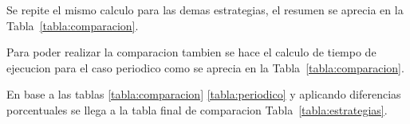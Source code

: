 \documentclass[conference]{IEEEtran}
\begin{document}
Se repite el mismo calculo para las demas estrategias, el resumen se aprecia en la Tabla~\ref{tabla:comparacion}.
\begin{table}[h]
    \centering
    \caption{Numero de activaciones y tiempos de ejecucucion de estrategias de CBE}
    \label{tabla:comparacion}
\end{table}
Para poder realizar la comparacion tambien se hace el calculo de tiempo de ejecucion para el caso periodico como se aprecia en la Tabla~\ref{tabla:comparacion}.

\begin{table}[h]
    \centering
    \caption{Tiempo de activación estrategias de control periodicas}
    \label{tabla:periodico}
\end{table}
En base a las tablas \ref{tabla:comparacion} \ref{tabla:periodico} y aplicando diferencias porcentuales se llega a la tabla final de comparacion Tabla~\ref{tabla:estrategias}.
\end{document}
